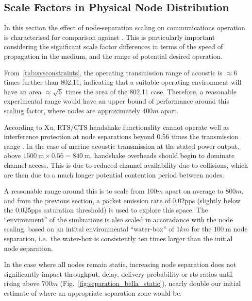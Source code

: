 \clearpage

\subsection{Scale Factors in Physical Node Distribution}

In this section the effect of node-separation scaling on communications operation is characterised for comparison against \cite{Guo11}. 
This is particularly important considering the significant scale factor differences in terms of the speed of propagation in the medium, and the range of potential desired operation.

From~\autoref{tab:sysconstraints}, the operating transmission range of acoustic is $\approx 6$ times further than 802.11, indicating that a suitable operating environment will have an area $\approx \sqrt{6}$ times the area of the 802.11 case. Therefore, a reasonable experimental range would have an upper bound of performance around this scaling factor, where nodes are approximately 400$m$ apart. 

According to Xu, RTS/CTS handshake functionality cannot operate well as interference protection at node separations beyond 0.56 times the transmission range \cite{Xu2002}.
In the case of marine acoustic transmission at the stated power output, above $\SI{1500}{\meter} \times 0.56 = \SI{840}{\meter}$, handshake overheads should begin to dominate channel access.
This is due to reduced channel availability due to collisions, which are then due to a much longer potential contention period between nodes. 

A reasonable range around this is to scale from 100$m$ apart on average to 800$m$, and from the previous section, a packet emission rate of 0.02pps (slightly below the 0.025pps saturation threshold) is used to explore this space.
The ``environment'' of the simluations is also scaled in accoradance with the node scaling, based on an intital environmental ``water-box'' of $1km$ for the $\SI{100}{\meter}$ node separation, i.e.\ the water-box is consistently ten times larger than the initial node separation.

In the case where all nodes remain static, increasing node separation does not significantly impact throughput, delay, delivery probability or \gls{rts} ratios until rising above 700$m$ (Fig.~\ref{fig:separation_bella_static}), nearly double our initial estimate of where an appropriate separation zone would be.


